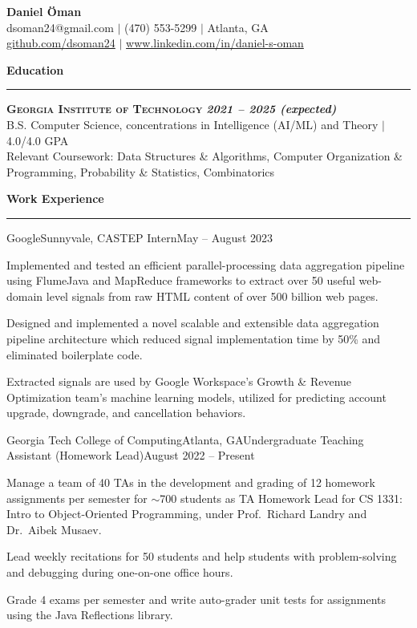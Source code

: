 \documentclass{article}
\newcommand{\horizontal}{\vspace{2pt}\hrule}
\newcommand{\school}[3]{\vspace{2pt}\textsc{\textbf{#1}} \hfill \textbf{\textit{#2}} \\ #3}
\newcommand{\sectitle}[1]{\vspace{2pt} \textbf{\large #1} \horizontal}
\begin{document}
\thispagestyle{empty}
\begin{center}
    \textbf{\LARGE Daniel Öman} \\
    dsoman24@gmail.com $|$ (470) 553-5299 $|$ Atlanta, GA \\
    \href{https://github.com/dsoman24}{github.com/dsoman24} $|$ \href{https://www.linkedin.com/in/daniel-s-oman/}{www.linkedin.com/in/daniel-s-oman}
\end{center}

\begin{flushleft}
\sectitle{Education}

\school{Georgia Institute of Technology}{2021 -- 2025 (expected)}
{B.S. Computer Science, concentrations in Intelligence (AI/ML) and Theory $|$ 4.0/4.0 GPA \\ Relevant Coursework: Data Structures \& Algorithms, Computer Organization \& Programming, Probability \& Statistics, Combinatorics}

\sectitle{Work Experience}

    \begin{experience}{Google}{Sunnyvale, CA}{STEP Intern}{May -- August 2023}
        \item Implemented and tested an efficient parallel-processing data aggregation pipeline using FlumeJava and MapReduce frameworks to extract over 50 useful web-domain level signals from raw HTML content of over 500 billion web pages.
        \item Designed and implemented a novel scalable and extensible data aggregation pipeline architecture which reduced signal implementation time by 50\% and eliminated boilerplate code.
        \item Extracted signals are used by Google Workspace's Growth \& Revenue Optimization team's machine learning models, utilized for predicting account upgrade, downgrade, and cancellation behaviors.
    \end{experience}

    \begin{experience}{Georgia Tech College of Computing}{Atlanta, GA}{Undergraduate Teaching Assistant (Homework Lead)}{August 2022 -- Present}
        \item Manage a team of 40 TAs in the development and grading of 12 homework assignments per semester for $\sim$700 students as TA Homework Lead for CS 1331: Intro to Object-Oriented Programming, under Prof.~Richard Landry and Dr.~Aibek Musaev.
        \item Lead weekly recitations for 50 students and help students with problem-solving and debugging during one-on-one office hours.
        \item Grade 4 exams per semester and write auto-grader unit tests for assignments using the Java Reflections library.
    \end{experience}


\end{flushleft}
\end{document}
